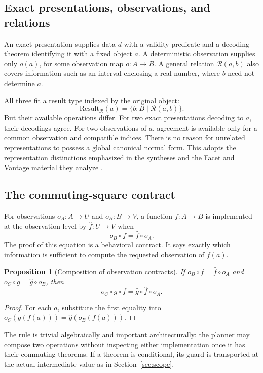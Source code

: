 \documentclass[11pt,a4paper]{article}
\theoremstyle{plain}
\newtheorem{proposition}[theorem]{Proposition}
\theoremstyle{definition}
\begin{document}
\subsection{Exact presentations, observations, and relations}
An exact presentation supplies data $d$ with a validity predicate and a decoding theorem identifying it with a fixed object $a$. A deterministic observation supplies only $o(a)$, for some observation map $o:A\to B$. A general relation $\mathcal R(a,b)$ also covers information such as an interval enclosing a real number, where $b$ need not determine $a$.

All three fit a result type indexed by the original object:
\[
 \mathrm{Result}_{\mathcal R}(a)
   =\{b:B\mid \mathcal R(a,b)\}.
\]
But their available operations differ. For two exact presentations decoding to $a$, their decodings agree. For two observations of $a$, agreement is available only for a common observation and compatible indices. There is no reason for unrelated representations to possess a global canonical normal form. This adopts the representation distinctions emphasized in the syntheses and the Facet and Vantage material they analyze \cite{synA,synB}.

\subsection{The commuting-square contract}
For observations $o_A:A\to U$ and $o_B:B\to V$, a function $f:A\to B$ is implemented at the observation level by $\widehat f:U\to V$ when
\begin{equation}
 o_B\circ f=\widehat f\circ o_A.\label{eq:square}
\end{equation}
The proof of this equation is a behavioral contract. It says exactly which information is sufficient to compute the requested observation of $f(a)$.

\begin{proposition}[Composition of observation contracts]
If $o_B\circ f=\widehat f\circ o_A$ and $o_C\circ g=\widehat g\circ o_B$, then
\[
 o_C\circ g\circ f=\widehat g\circ\widehat f\circ o_A.
\]
\end{proposition}
\begin{proof}
For each $a$, substitute the first equality into
$o_C(g(f(a)))=\widehat g(o_B(f(a)))$.
\end{proof}
The rule is trivial algebraically and important architecturally: the planner may compose two operations without inspecting either implementation once it has their commuting theorems. If a theorem is conditional, its guard is transported at the actual intermediate value as in Section~\ref{sec:scope}.
\end{document}

